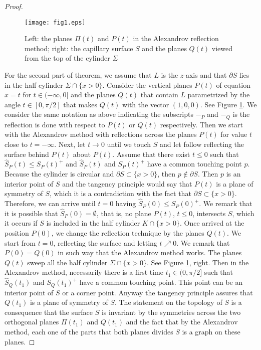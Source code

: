 \documentclass[12pt,a4paper]{amsart}
\begin{document}
\begin{proof}
\begin{enumerate}
\end{enumerate}
\begin{figure}[hbtp]
\begin{center}
\texttt{[image: fig1.eps]}
\end{center}
\caption{Left: the planes $\Pi(t)$ and $P(t)$ in the Alexandrov reflection method; right: the capillary surface $S$ and the planes $Q(t)$ viewed from the top of the cylinder $\Sigma$}\label{fig1}
\end{figure}
For the second part of theorem, we assume that $L$ is the $z$-axis and that $\partial S$ lies in the half cylinder $\Sigma\cap\{x>0\}$. Consider the vertical planes $P(t)$ of equation $x=t$ for $t\in (-\infty,0]$ and the planes $Q(t)$ that contain $L$ parametrized by the angle $t\in [0,\pi/2]$ that makes $Q(t)$ with the vector $(1,0,0)$. See Figure \ref{fig1}. We consider the same notation as above indicating the subscripts $-_{P}$ and $-_{Q}$ is the reflection is done with respect to $P(t)$ or $Q(t)$ respectively. Then we start with the Alexandrov method with reflections across the planes $P(t)$ for value $t$ close to $t=-\infty$. Next, let $t\rightarrow 0$ until we touch $S$ and let follow reflecting the surface behind $P(t)$ about $P(t)$. Assume that there exist $t\leq 0$ such that $\hat{S}_P(t)\leq S_P(t)^{+}$ and
$\hat{S}_P(t)$ and $S_P(t)^{+}$ have a common touching point $p$. Because the cylinder is circular and $\partial S\subset\{x>0\}$, then $p\not\in\partial S$. Then $p$ is an interior point of $S$ and the tangency principle would say that $P(t)$ is a plane of symmetry of $S$, which it is a contradiction with the fact that $\partial S\subset \{x>0\}$. Therefore, we can arrive until $t=0$ having $\hat{S}_P(0)\leq S_P(0)^+$. We remark that it is possible that $\hat{S}_P(0)=\emptyset$, that is, no plane $P(t)$, $t\leq 0$, intersects $S$, which it occurs if $S$ is included in the half cylinder $K\cap\{x>0\}$.
Once arrived at the position $P(0)$, we change the reflection technique by the planes $Q(t)$. We start from $t=0$, reflecting the surface and letting $t\nearrow 0$. We remark that $P(0)=Q(0)$ in such way that the Alexandrov method works. The planes $Q(t)$ sweep all the half cylinder $\Sigma\cap \{x>0\}$. See Figure \ref{fig1}, right. Then in the Alexandrov method, necessarily there is a first time $t_1\in (0,\pi/2]$ such that $\hat{S}_Q(t_1)$ and $S_Q(t_1)^+$ have a common touching point. This point can be an interior point of $S$ or a corner point. Anyway the tangency principle assures that $Q(t_1)$ is a plane of symmetry of $S$. The statement on the topology of $S$ is a consequence that the surface $S$ is invariant by the symmetries across the two orthogonal planes $\Pi(t_1)$ and $Q(t_1)$ and the fact that by the Alexandrov method, each one of the parts that both planes divides $S$ is a graph on these planes.
\end{proof}
\end{document}
